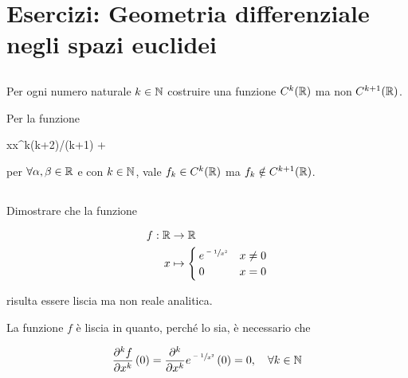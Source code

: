 \chapter{Esercizi: Geometria differenziale negli spazi euclidei}

\setcounter{tocdepth}{2}

\section{}\label{es1-1}

\begin{tcolorbox}
	Per ogni numero naturale $ k \in \mathbb{N} $ costruire una funzione $ C^{k}(\mathbb{R}) $ ma non $ C^{k+1}(\mathbb{R}) $.
\end{tcolorbox}

Per la funzione

	{\R}{\R}
	{x}{\alpha x^{k(k+2)/(k+1)} + \beta}
	
per $ \forall \alpha,\beta \in \mathbb{R} $ e con $ k \in \mathbb{N} $, vale $ f_{k} \in C^{k}(\mathbb{R}) $ ma $ f_{k} \notin C^{k+1}(\mathbb{R}) $.

%

\newpage

%

\section{}\label{es1-2}

\begin{tcolorbox}
	Dimostrare che la funzione
	
	\begin{align}
		\begin{split}
			f : \R & \to \R\\
			x &\mapsto%
				\begin{cases}
					e^{\sfrac{-1}{x^{2}}} & x \neq 0\\
					0 & x = 0
				\end{cases}
		\end{split}
	\end{align}
	
	risulta essere liscia ma non reale analitica.
\end{tcolorbox}

La funzione $ f $ è liscia in quanto, perché lo sia, è necessario che

\begin{equation}
	\pdv[k]{f}{x} \, (0) = \pdv[k]{x} e^{\sfrac{-1}{x^{2}}} \, (0) = 0 \qcomma \forall k \in \N
\end{equation}

